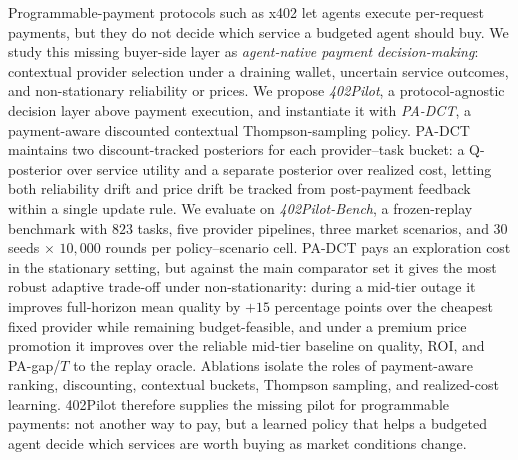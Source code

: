 Programmable-payment protocols such as x402 let agents execute per-request payments, but they do not decide which service a budgeted agent should buy. We study this missing buyer-side layer as \emph{agent-native payment decision-making}: contextual provider selection under a draining wallet, uncertain service outcomes, and non-stationary reliability or prices. We propose \emph{402Pilot}, a protocol-agnostic decision layer above payment execution, and instantiate it with \emph{PA-DCT}, a payment-aware discounted contextual Thompson-sampling policy. PA-DCT maintains two discount-tracked posteriors for each provider--task bucket: a Q-posterior over service utility and a separate posterior over realized cost, letting both reliability drift and price drift be tracked from post-payment feedback within a single update rule. We evaluate on \emph{402Pilot-Bench}, a frozen-replay benchmark with $823$ tasks, five provider pipelines, three market scenarios, and $30$ seeds $\times$ $10{,}000$ rounds per policy--scenario cell. PA-DCT pays an exploration cost in the stationary setting, but against the main comparator set it gives the most robust adaptive trade-off under non-stationarity: during a mid-tier outage it improves full-horizon mean quality by $+15$ percentage points over the cheapest fixed provider while remaining budget-feasible, and under a premium price promotion it improves over the reliable mid-tier baseline on quality, ROI, and PA-gap/$T$ to the replay oracle. Ablations isolate the roles of payment-aware ranking, discounting, contextual buckets, Thompson sampling, and realized-cost learning. 402Pilot therefore supplies the missing pilot for programmable payments: not another way to pay, but a learned policy that helps a budgeted agent decide which services are worth buying as market conditions change.
